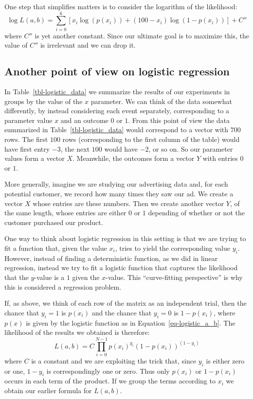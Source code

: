 \documentclass[
  11pt,
  letterpaper,
]{scrbook}
\theoremstyle{plain}
\theoremstyle{plain}
\theoremstyle{remark}
\begin{document}
One step that simplifies matters is to consider the logarithm of the
likelihood: \[
\log L (a,b)= \sum_{i=0}^{6} \left[ x_{i}\log(p(x_{i})) + (100-x_{i})\log(1-p(x_{i}))\right] +C''
\] where \(C''\) is yet another constant. Since our ultimate goal is to
maximize this, the value of \(C''\) is irrelevant and we can drop it.

\hypertarget{another-point-of-view-on-logistic-regression}{%
\subsection{Another point of view on logistic
regression}\label{another-point-of-view-on-logistic-regression}}

In Table~\ref{tbl-logistic_data} we summarize the results of our
experiments in groups by the value of the \(x\) parameter. We can think
of the data somewhat differently, by instead considering each event
separately, corresponding to a parameter value \(x\) and an outcome
\(0\) or \(1\). From this point of view the data summarized in
Table~\ref{tbl-logistic_data} would correspond to a vector with \(700\)
rows. The first \(100\) rows (corresponding to the first column of the
table) would have first entry \(-3\), the next \(100\) would have
\(-2\), or so on. So our parameter values form a vector \(X\).
Meanwhile, the outcomes form a vector \(Y\) with entries \(0\) or \(1\).

More generally, imagine we are studying our advertising data and, for
each potential customer, we record how many times they saw our ad. We
create a vector \(X\) whose entries are these numbers. Then we create
another vector \(Y\), of the same length, whose entries are either \(0\)
or \(1\) depending of whether or not the customer purchased our product.

One way to think about logistic regression in this setting is that we
are trying to fit a function that, given the value \(x_i\), tries to
yield the corresponding value \(y_i\). However, instead of finding a
deterministic function, as we did in linear regression, instead we try
to fit a logistic function that captures the likelihood that the
\(y\)-value is a \(1\) given the \(x\)-value. This ``curve-fitting
perspective'' is why this is considered a regression problem.

If, as above, we think of each row of the matrix as an independent
trial, then the chance that \(y_i=1\) is \(p(x_i)\) and the chance that
\(y_i=0\) is \(1-p(x_i)\), where \(p(x)\) is given by the logistic
function as in Equation~\ref{eq-logistic_a_b}. The likelihood of the
results we obtained is therefore: \[
L(a,b) = C \prod_{i=0}^{N-1} p(x_i)^{y_i}(1-p(x_i))^{(1-y_i)}
\] where \(C\) is a constant and we are exploiting the trick that, since
\(y_i\) is either zero or one, \(1-y_i\) is correspondingly one or zero.
Thus only \(p(x_i)\) or \(1-p(x_i)\) occurs in each term of the product.
If we group the terms according to \(x_i\) we obtain our earlier formula
for \(L(a,b)\).
\end{document}
